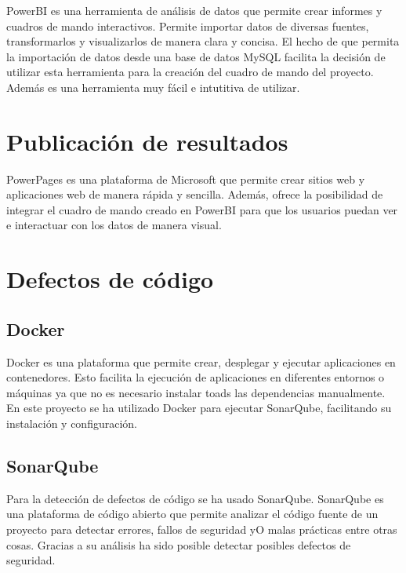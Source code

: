 PowerBI es una herramienta de análisis de datos que permite crear informes y cuadros de mando interactivos.
Permite importar datos de diversas fuentes, transformarlos y visualizarlos de manera clara y concisa.
El hecho de que permita la importación de datos desde una base de datos MySQL facilita la decisión de utilizar esta herramienta para la creación del cuadro de mando del proyecto.
Además es una herramienta muy fácil e intutitiva de utilizar.

\section{Publicación de resultados}

PowerPages es una plataforma de Microsoft que permite crear sitios web y aplicaciones web de manera rápida y sencilla.
Además, ofrece la posibilidad de integrar el cuadro de mando creado en PowerBI para que los usuarios puedan ver e interactuar con los datos de manera visual.

\section{Defectos de código}

\subsection{Docker}

Docker es una plataforma que permite crear, desplegar y ejecutar aplicaciones en contenedores. 
Esto facilita la ejecución de aplicaciones en diferentes entornos o máquinas ya que no es necesario instalar toads las dependencias manualmente.
En este proyecto se ha utilizado Docker para ejecutar SonarQube, facilitando su instalación y configuración.

\subsection{SonarQube}

Para la detección de defectos de código se ha usado SonarQube. 
SonarQube es una plataforma de código abierto que permite analizar el código fuente
de un proyecto para detectar errores, fallos de seguridad yO malas prácticas entre otras cosas.
Gracias a su análisis ha sido posible detectar posibles defectos de seguridad.
